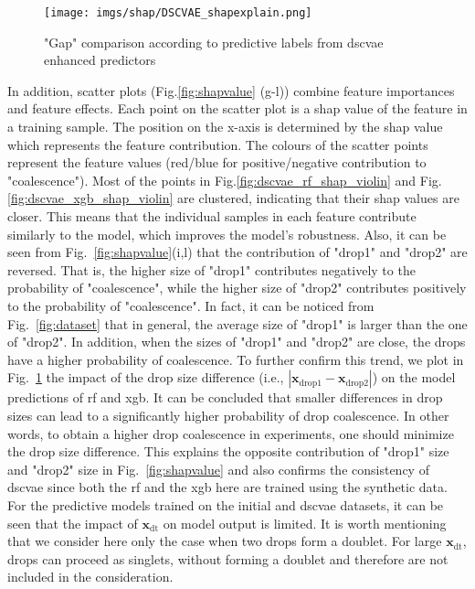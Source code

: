 \documentclass[twoside,twocolumn,9pt]{article}
\begin{document}
\begin{figure}[!htb]
  \centering
  \texttt{[image: imgs/shap/DSCVAE\_shapexplain.png]}  \caption{"Gap" comparison according to predictive labels from \acrshort*{dscvae} enhanced predictors}\label{fig:shapexplain}
\end{figure}
In addition, scatter plots (Fig.\ref{fig:shapvalue} (g-l)) combine feature importances and feature effects. Each point on the scatter plot is a \acrshort*{shap} value of the feature in a training sample. The position on the x-axis is determined by the \acrshort*{shap} value which represents the feature contribution. The colours of the scatter points represent the feature values (red/blue for positive/negative contribution to "coalescence"). Most of the points in Fig.\ref{fig:dscvae_rf_shap_violin} and Fig.\ref{fig:dscvae_xgb_shap_violin} are clustered, indicating that their \acrshort*{shap} values are closer. This means that the individual samples in each feature contribute similarly to the model, which improves the model's robustness. Also, it can be seen from Fig.~\ref{fig:shapvalue}(i,l) that the contribution of "drop1" and "drop2" are reversed. That is, the higher size of "drop1" contributes negatively to the probability of "coalescence", while the higher size of "drop2" contributes positively to the probability of "coalescence". In fact, it can be noticed from Fig.~\ref{fig:dataset} that in general, the average size of "drop1" is larger than the one of "drop2". In addition, when the sizes of "drop1" and "drop2" are close, the drops have a higher probability of coalescence. To further confirm this trend, we plot in Fig.~\ref{fig:shapexplain} the impact of the drop size difference (i.e., $|\textbf{x}_\textrm{drop1}-\textbf{x}_\textrm{drop2}|$) on the model predictions of \acrshort*{rf} and \acrlong*{xgb}. 
It can be concluded that smaller differences in drop sizes can lead to a significantly higher probability of drop coalescence. In other words, to obtain a higher drop coalescence in experiments, one should minimize the drop size difference. This explains the opposite contribution of "drop1" size and "drop2" size in Fig.~\ref{fig:shapvalue} and also confirms the consistency of \acrshort*{dscvae} since both the \acrshort*{rf} and the \acrlong*{xgb} here are trained using the synthetic data. For the predictive models trained on the initial and \acrshort*{dscvae} datasets, it can be seen that the impact of $\textbf{x}_\textrm{dt}$ on model output is limited. It is worth mentioning that we consider here only the case when two drops form a doublet. For large $\textbf{x}_\textrm{dt}$, drops can proceed as singlets, without forming a doublet and therefore are not included in the consideration.
\end{document}
